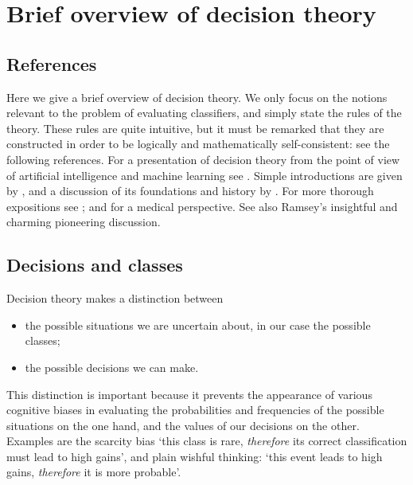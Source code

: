 \documentclass[\ifafour a4paper,12pt,\else a5paper,10pt,\fi%
onecolumn,oneside,article,%
british%
]{memoir}
\theoremstyle{remark}
\theoremstyle{innote}
\newcommand*{\wrench}{{\fontencoding{U}\fontfamily{fontawesomethree}\selectfont\symbol{114}}}
\newcommand{\mynotew}[1]{{\footnotesize\color{notecolour}\wrench\ #1}}
\renewcommand*{\|}[1][]{\nonscript\:#1\vert\nonscript\:\mathopen{}}
\newcommand*{\sect}{\S}%
\newcommand*{\chap}{ch.}%
\begin{document}




\section{Brief overview of decision theory}
\label{sec:decision_theory}

\subsection{References}
\label{sec:dt_refs}

Here we give a brief overview of decision theory. We only focus on the notions relevant to the problem of evaluating classifiers, and simply state the rules of the theory. These rules are quite intuitive, but it must be remarked that they are constructed in order to be logically and mathematically self-consistent: see the following references. For a presentation of decision theory from the point of view of artificial intelligence and machine learning see \textcite[\chap~15]{russelletal1995_r2022}. Simple introductions are given by \textcite{jeffrey1965,north1968,raiffa1968_r1970}, and a discussion of its foundations and history by \textcite{steeleetal2015_r2020}. For more thorough expositions see \textcite{raiffaetal1961_r2000,berger1980_r1985,savage1954_r1972}; and \textcite{soxetal1988_r2013,huninketal2001_r2014} for a medical perspective. See also Ramsey's \parencites*{ramsey1926} insightful and charming pioneering discussion.

\subsection{Decisions and classes}
\label{sec:dt_dec_classes}

Decision theory makes a distinction between
\begin{itemize}
\item the possible situations we are uncertain about, in our case the possible classes;
\item the possible decisions we can make.
\end{itemize}
This distinction is important because it prevents the appearance of various cognitive biases \autocites{kahnemanetal1982_r2008,gilovichetal2002_r2009,kahneman2011} in evaluating the probabilities and frequencies of the possible situations on the one hand, and the values of our decisions on the other. Examples are the scarcity bias\autocites{camereretal1989,kimetal1999,mittoneetal2009} \enquote*{this class is rare, \emph{therefore} its correct classification must lead to high gains}, and plain wishful thinking: \enquote*{this event leads to high gains, \emph{therefore} it is more probable}.
\end{document}
